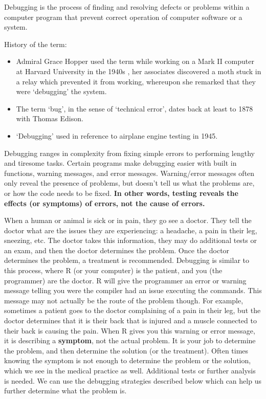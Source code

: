 \documentclass[
]{book}
\begin{document}
Debugging is the process of finding and resolving defects or problems within a computer program that prevent correct operation of computer software or a system.

History of the term:

\begin{itemize}
\item
  Admiral Grace Hopper used the term while working on a Mark II computer at Harvard University in the 1940s , her associates discovered a moth stuck in a relay which prevented it from working, whereupon she remarked that they were `debugging' the system.
\item
  The term `bug', in the sense of `technical error', dates back at least to 1878 with Thomas Edison.
\item
  `Debugging' used in reference to airplane engine testing in 1945.
\end{itemize}

Debugging ranges in complexity from fixing simple errors to performing lengthy and tiresome tasks. Certain programs make debugging easier with built in functions, warning messages, and error messages. Warning/error messages often only reveal the presence of problems, but doesn't tell us what the problems are, or how the code needs to be fixed. \textbf{In other words, testing reveals the effects (or symptoms) of errors, not the cause of errors.}

When a human or animal is sick or in pain, they go see a doctor. They tell the doctor what are the issues they are experiencing: a headache, a pain in their leg, sneezing, etc. The doctor takes this information, they may do additional tests or an exam, and then the doctor determines the problem. Once the doctor determines the problem, a treatment is recommended. Debugging is similar to this process, where R (or your computer) is the patient, and you (the programmer) are the doctor. R will give the programmer an error or warning message telling you were the compiler had an issue executing the commands. This message may not actually be the route of the problem though. For example, sometimes a patient goes to the doctor complaining of a pain in their leg, but the doctor determines that it is their back that is injured and a muscle connected to their back is causing the pain. When R gives you this warning or error message, it is describing a \textbf{symptom}, not the actual problem. It is your job to determine the problem, and then determine the solution (or the treatment). Often times knowing the symptom is not enough to determine the problem or the solution, which we see in the medical practice as well. Additional tests or further analysis is needed. We can use the debugging strategies described below which can help us further determine what the problem is.
\end{document}
